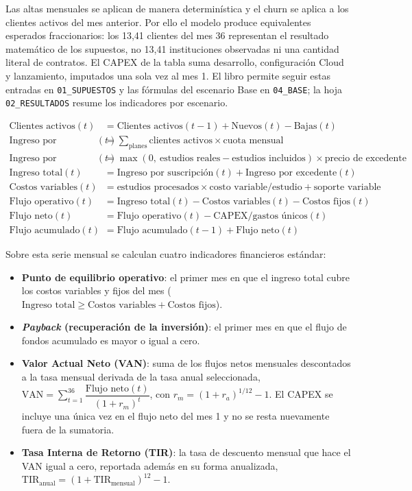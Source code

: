 Las altas mensuales se aplican de manera determinística y el churn se aplica a los clientes activos del mes anterior. Por ello el modelo produce equivalentes esperados fraccionarios: los 13,41 clientes del mes 36 representan el resultado matemático de los supuestos, no 13,41 instituciones observadas ni una cantidad literal de contratos. El CAPEX de la tabla suma desarrollo, configuración Cloud y lanzamiento, imputados una sola vez al mes 1. El libro permite seguir estas entradas en \texttt{01\_SUPUESTOS} y las fórmulas del escenario Base en \texttt{04\_BASE}; la hoja \texttt{02\_RESULTADOS} resume los indicadores por escenario.

\begin{align*}
\text{Clientes activos}(t) &= \text{Clientes activos}(t-1) + \text{Nuevos}(t) - \text{Bajas}(t) \\
\text{Ingreso por suscripción}(t) &= \sum_{\text{planes}} \text{clientes activos} \times \text{cuota mensual} \\
\text{Ingreso por excedente}(t) &= \max(0,\ \text{estudios reales} - \text{estudios incluidos}) \times \text{precio de excedente} \\
\text{Ingreso total}(t) &= \text{Ingreso por suscripción}(t) + \text{Ingreso por excedente}(t) \\
\text{Costos variables}(t) &= \text{estudios procesados} \times \text{costo variable/estudio} + \text{soporte variable} \\
\text{Flujo operativo}(t) &= \text{Ingreso total}(t) - \text{Costos variables}(t) - \text{Costos fijos}(t) \\
\text{Flujo neto}(t) &= \text{Flujo operativo}(t) - \text{CAPEX/gastos únicos}(t) \\
\text{Flujo acumulado}(t) &= \text{Flujo acumulado}(t-1) + \text{Flujo neto}(t)
\end{align*}

Sobre esta serie mensual se calculan cuatro indicadores financieros estándar:

\begin{itemize}
    \item \textbf{Punto de equilibrio operativo}: el primer mes en que el ingreso total cubre los costos variables y fijos del mes ($\text{Ingreso total} \geq \text{Costos variables} + \text{Costos fijos}$).
    \item \textbf{\textit{Payback} (recuperación de la inversión)}: el primer mes en que el flujo de fondos acumulado es mayor o igual a cero.
    \item \textbf{Valor Actual Neto (VAN)}: suma de los flujos netos mensuales descontados a la tasa mensual derivada de la tasa anual seleccionada, $\text{VAN} = \sum_{t=1}^{36} \dfrac{\text{Flujo neto}(t)}{(1+r_m)^t}$, con $r_m = (1+r_a)^{1/12}-1$. El CAPEX se incluye una única vez en el flujo neto del mes 1 y no se resta nuevamente fuera de la sumatoria.
    \item \textbf{Tasa Interna de Retorno (TIR)}: la tasa de descuento mensual que hace el VAN igual a cero, reportada además en su forma anualizada, $\text{TIR}_{\text{anual}} = (1+\text{TIR}_{\text{mensual}})^{12}-1$.
\end{itemize}

